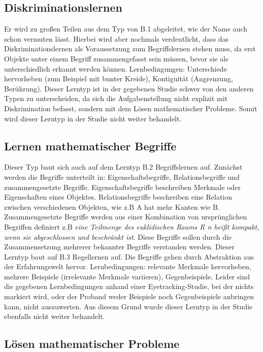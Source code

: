 \subsection[]{Diskriminationslernen}

Er wird zu großen Teilen aus dem Typ von B.1 abgeleitet, wie der Name auch schon vermuten lässt. Hierbei wird aber nochmals verdeutlicht, dass das Diskriminationslernen als Voraussetzung zum Begriffslernen stehen muss, da erst Objekte unter einem Begriff zusammengefasst sein müssen, bevor sie als unterschiedlich erkannt werden können.
Lernbedingungen: Unterschiede hervorheben (zum Beispiel mit bunter Kreide), Kontiguität (Angrenzung, Berührung)\cite{DudenKontiguitaet}.
Dieser Lerntyp ist in der gegebenen Studie schwer von den anderen Typen zu unterscheiden, da sich die Aufgabenstellung nicht explizit mit Diskrimination befasst, sondern mit dem Lösen mathematischer Probleme. Somit wird dieser Lerntyp in der Studie nicht weiter behandelt\cite{zech1983grundkurs}.

\subsection[]{Lernen mathematischer Begriffe}

Dieser Typ baut sich auch auf dem Lerntyp B.2 Begriffslernen auf. Zunächst werden die Begriffe unterteilt in: Eigenschaftsbegriffe, Relationsbegriffe und zusammengesetzte Begriffe. Eigenschaftsbegriffe beschreiben Merkmale oder Eigenschaften eines Objektes. Relationsbegriffe beschreiben eine Relation zwischen verschiedenen Objekten, wie z.B A hat mehr Kanten wie B. Zusammengesetzte Begriffe werden aus einer Kombination von ursprünglichen Begriffen definiert z.B \textit {eine Teilmenge des euklidischen Raums R n heißt kompakt, wenn sie abgeschlossen und beschränkt ist}. Diese Begriffe sollen durch die Zusammensetzung mehrerer bekannter Begriffe verstanden werden. Dieser Lerntyp baut auf B.3 Regellernen auf. Die Begriffe gehen durch Abstraktion aus der Erfahrungswelt hervor.
Lernbedingungen: relevante Merkmale hervorheben, mehrere Beispiele (irrelevante Merkmale variieren), Gegenbeispiele.
Leider sind die gegebenen Lernbedingungen anhand einer Eyetracking-Studie, bei der nichts markiert wird, oder der Proband weder Beispiele noch Gegenbeispiele anbringen kann, nicht auszuwerten. Aus diesem Grund wurde dieser Lerntyp in der Studie ebenfalls nicht weiter behandelt\cite{zech1983grundkurs}. 

\subsection[]{Lösen mathematischer Probleme}

